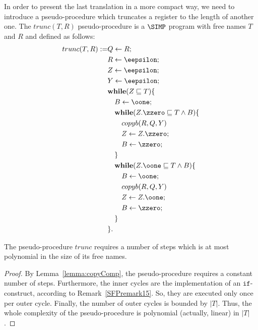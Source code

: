 In order to present the last translation in a more
compact way, we need to introduce
a pseudo-procedure which truncates
a register to the length of another one.
{The} $trunc(T,R)$ pseudo-procedure
is a $\SIMP$ program with free names
$T$ and $R$ and defined as follows:
\begin{align*}
trunc(T,R) := &Q \leftarrow R; \\
%
& R \leftarrow \eepsilon; \\
%
& Z \leftarrow \eepsilon; \\
%
& Y \leftarrow \eepsilon; \\
%
&\mathbf{while}(Z\sqsubseteq T) \{ \\
%
& \ \ \ B\leftarrow {\oone}; \\
%
& \ \ \ \mathbf{while}(Z.{\zzero}
\sqsubseteq T \wedge B)\{ \\
%
& \ \ \ \ \ \ copyb(R,Q,Y) \\
%
& \ \ \ \ \ \ Z \leftarrow Z.{\zzero}; \\
%
& \ \ \ \ \ \ B \leftarrow {\zzero}; \\
%
& \ \ \ \} \\
%
& \ \ \ \mathbf{while}(Z.{\oone}
\sqsubseteq T\wedge B)\{ \\
%
& \ \ \ \ \ \ B\leftarrow {\oone}; \\
%
& \ \ \ \ \ \ copyb(R,Q,Y) \\
%
& \ \ \ \ \ \ Z \leftarrow Z.{\oone}; \\
%
& \ \ \ \ \ \ B \leftarrow {\zzero}; \\
%
& \ \ \ \} \\
& \}.
\end{align*}









\begin{lemma}\label{lemma:truncComp}
The pseudo-procedure $trunc$
requires a number of steps which is at most
polynomial in the size of its free names.
\end{lemma}

\begin{proof}
By Lemma~\ref{lemma:copyComp},
the pseudo-procedure requires a constant number
of steps.
Furthermore, the inner cycles are the implementation
of an $\mathtt{if}$-construct,
according to Remark~\ref{SFPremark15}.
So, they are executed only once per outer cycle.
Finally, the number of outer cycles
is bounded by $|T|$.
Thus, the whole complexity of the pseudo-procedure
is polynomial (actually, linear) in $|T|$.
\end{proof}












